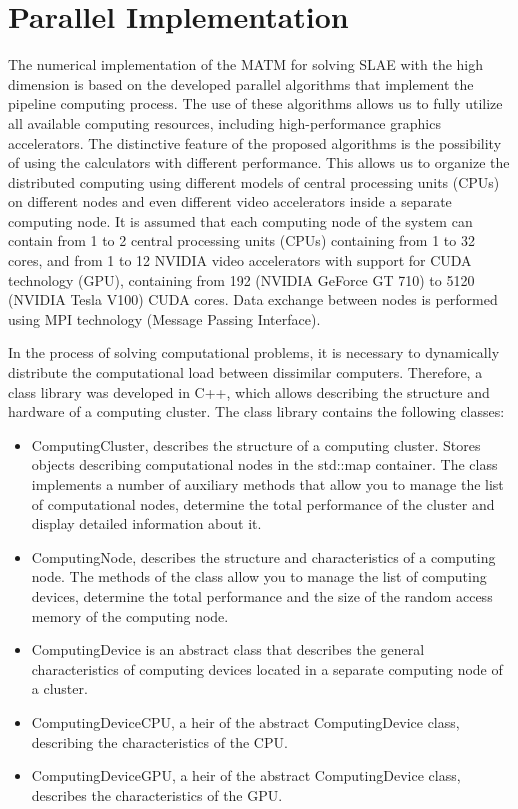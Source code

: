 \documentclass{svproc}
\begin{document}
%
%
%
\section{Parallel Implementation}

The numerical implementation of the MATM for solving SLAE with the high dimension is based on the developed parallel algorithms that implement the pipeline computing process.
The use of these algorithms allows us to fully utilize all available computing resources, including high-performance graphics accelerators.
The distinctive feature of the proposed algorithms is the possibility of using the calculators with different performance.
This allows us to organize the distributed computing using different models of central processing units (CPUs) on different nodes and even different video accelerators inside a separate computing node.
It is assumed that each computing node of the system can contain from 1 to 2 central processing units (CPUs) containing from 1 to 32 cores, and from 1 to 12 NVIDIA video accelerators with support for CUDA technology (GPU), containing from 192 (NVIDIA GeForce GT 710) to 5120 (NVIDIA Tesla V100) CUDA cores.
Data exchange between nodes is performed using MPI technology (Message Passing Interface).

In the process of solving computational problems, it is necessary to dynamically distribute the computational load between dissimilar computers.
Therefore, a class library was developed in C++, which allows describing the structure and hardware of a computing cluster. The class library contains the following classes: 
\begin{itemize}
	\item ComputingCluster, describes the structure of a computing cluster.
	Stores objects describing computational nodes in the std::map container. The class implements a number of auxiliary methods that allow you to manage the list of computational nodes, determine the total performance of the cluster and display detailed information about it.
	\item ComputingNode, describes the structure and characteristics of a computing node. The methods of the class allow you to manage the list of computing devices, determine the total performance and the size of the random access memory of the computing node.
	\item ComputingDevice is an abstract class that describes the general characteristics of computing devices located in a separate computing node of a cluster.
	\item ComputingDeviceCPU, a heir of the abstract ComputingDevice class, describing the characteristics of the CPU.
	\item ComputingDeviceGPU, a heir of the abstract ComputingDevice class, describes the characteristics of the GPU.
\end{itemize}
\end{document}
